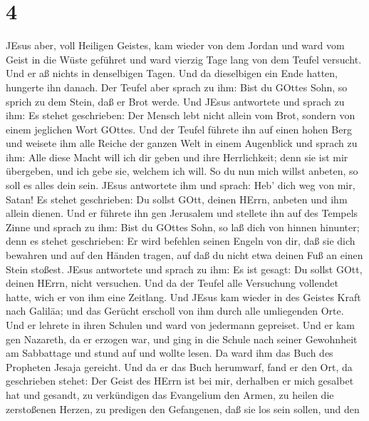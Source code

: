 \hypertarget{section-3}{%
\section{4}\label{section-3}}

 JEsus aber, voll Heiligen Geistes, kam wieder von dem
Jordan und ward vom Geist in die Wüste geführet  und ward
vierzig Tage lang von dem Teufel versucht. Und er aß nichts in
denselbigen Tagen. Und da dieselbigen ein Ende hatten, hungerte ihn
danach.  Der Teufel aber sprach zu ihm: Bist du GOttes Sohn,
so sprich zu dem Stein, daß er Brot werde.  Und JEsus
antwortete und sprach zu ihm: Es stehet geschrieben: Der Mensch lebt
nicht allein vom Brot, sondern von einem jeglichen Wort GOttes.
 Und der Teufel führete ihn auf einen hohen Berg und weisete
ihm alle Reiche der ganzen Welt in einem Augenblick  und
sprach zu ihm: Alle diese Macht will ich dir geben und ihre
Herrlichkeit; denn sie ist mir übergeben, und ich gebe sie, welchem ich
will.  So du nun mich willst anbeten, so soll es alles dein
sein.  JEsus antwortete ihm und sprach: Heb' dich weg von
mir, Satan! Es stehet geschrieben: Du sollst GOtt, deinen HErrn, anbeten
und ihm allein dienen.  Und er führete ihn gen Jerusalem und
stellete ihn auf des Tempels Zinne und sprach zu ihm: Bist du GOttes
Sohn, so laß dich von hinnen hinunter;  denn es stehet
geschrieben: Er wird befehlen seinen Engeln von dir, daß sie dich
bewahren  und auf den Händen tragen, auf daß du nicht etwa
deinen Fuß an einen Stein stoßest.  JEsus antwortete und
sprach zu ihm: Es ist gesagt: Du sollst GOtt, deinen HErrn, nicht
versuchen.  Und da der Teufel alle Versuchung vollendet
hatte, wich er von ihm eine Zeitlang.  Und JEsus kam wieder
in des Geistes Kraft nach Galiläa; und das Gerücht erscholl von ihm
durch alle umliegenden Orte.  Und er lehrete in ihren
Schulen und ward von jedermann gepreiset.  Und er kam gen
Nazareth, da er erzogen war, und ging in die Schule nach seiner
Gewohnheit am Sabbattage und stund auf und wollte lesen. 
Da ward ihm das Buch des Propheten Jesaja gereicht. Und da er das Buch
herumwarf, fand er den Ort, da geschrieben stehet:  Der
Geist des HErrn ist bei mir, derhalben er mich gesalbet hat und gesandt,
zu verkündigen das Evangelium den Armen, zu heilen die zerstoßenen
Herzen, zu predigen den Gefangenen, daß sie los sein sollen, und den
